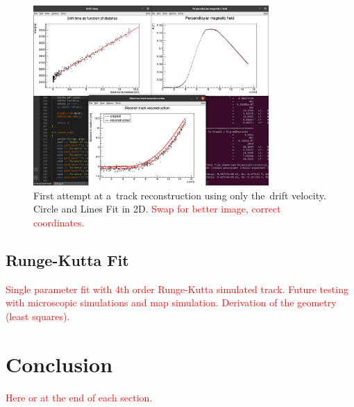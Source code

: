 \documentclass[]{article}
\begin{document}
	\begin{figure}
		\centering
		\includegraphics[width=0.8\textwidth]{9010_circle2D.png}
		\caption{First attempt at a~track reconstruction using only the~drift velocity. Circle and Lines Fit in 2D. \textcolor{red}{Swap for better image, correct coordinates.}}
		\label{fig:9010circle2D}
	\end{figure}
	
	\subsection{Runge-Kutta Fit}
	\textcolor{red}{Single parameter fit with 4th order Runge-Kutta simulated track. Future testing with microscopic simulations and map simulation. Derivation of the geometry (least squares).}
	
	\section{Conclusion}
	\textcolor{red}{Here or at the end of each section.}
	
	
	
	
	
\end{document}
